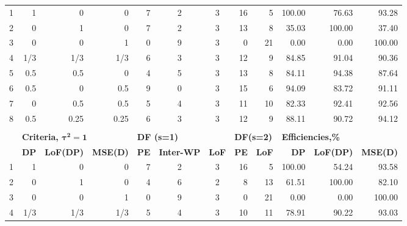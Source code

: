 \begin{table}[h]
{\begin{tabular}{rrrrcccrrrrr}
1 & 1    & 0    & 0    & \multicolumn{1}{|r}{7} & 2 & 3 & \multicolumn{1}{|r}{16} & 5  & \multicolumn{1}{|r}{100.00} & 76.63  & 93.28  \\
2 & 0    & 1    & 0    & \multicolumn{1}{|r}{7} & 2 & 3 & \multicolumn{1}{|r}{13} & 8  & \multicolumn{1}{|r}{35.03}  & 100.00 & 37.40  \\
3 & 0    & 0    & 1    & \multicolumn{1}{|r}{0} & 9 & 3 & \multicolumn{1}{|r}{0}  & 21 & \multicolumn{1}{|r}{0.00}   & 0.00   & 100.00 \\
4 &   1/3  & 1/3  & 1/3& \multicolumn{1}{|r}{6} & 3 & 3 & \multicolumn{1}{|r}{12} & 9  & \multicolumn{1}{|r}{84.85}  & 91.04  & 90.36  \\
5 & 0.5  & 0.5  & 0    & \multicolumn{1}{|r}{4} & 5 & 3 & \multicolumn{1}{|r}{13} & 8  & \multicolumn{1}{|r}{84.11}  & 94.38  & 87.64  \\
6 & 0.5  & 0    & 0.5  & \multicolumn{1}{|r}{9} & 0 & 3 & \multicolumn{1}{|r}{15} & 6  & \multicolumn{1}{|r}{94.09}  & 83.72  & 91.11  \\
7 & 0    & 0.5  & 0.5  & \multicolumn{1}{|r}{5} & 4 & 3 & \multicolumn{1}{|r}{11} & 10 & \multicolumn{1}{|r}{82.33}  & 92.41  & 92.56  \\
8 & 0.5  & 0.25 & 0.25 & \multicolumn{1}{|r}{6} & 3 & 3 & \multicolumn{1}{|r}{12} & 9  & \multicolumn{1}{|r}{88.11}  & 90.72  & 94.12 \\  
 &      &      &      &   &   &   &    &    &        &        &        \\  
  & \multicolumn{3}{l}{\textbf{Criteria, $\bm{\tau^2=1}$}}             & \multicolumn{3}{l}{\textbf{DF (s=1)}}          & \multicolumn{2}{l}{\textbf{DF(s=2)}} & \multicolumn{3}{l}{\textbf{Efficiencies,\%}}     \\
  & \textbf{DP} & \textbf{LoF(DP)} & \textbf{MSE(D)} & \textbf{PE} & \textbf{Inter-WP} & \textbf{LoF} & \textbf{PE}      & \textbf{LoF}      & \textbf{DP} & \textbf{LoF(DP)} & \textbf{MSE(D)} \\
1 & 1    & 0    & 0    & \multicolumn{1}{|r}{7} & 2 & 3 & \multicolumn{1}{|r}{16} & 5  & \multicolumn{1}{|r}{100.00} & 54.24  & 93.58  \\
2 & 0    & 1    & 0    & \multicolumn{1}{|r}{4} & 6 & 2 & \multicolumn{1}{|r}{8}  & 13 & \multicolumn{1}{|r}{61.51}  & 100.00 & 82.10  \\
3 & 0    & 0    & 1    & \multicolumn{1}{|r}{0} & 9 & 3 & \multicolumn{1}{|r}{0}  & 21 & \multicolumn{1}{|r}{0.00}   & 0.00   & 100.00 \\
4 & 1/3  & 1/3  & 1/3  & \multicolumn{1}{|r}{5} & 4 & 3 & \multicolumn{1}{|r}{10} & 11 & \multicolumn{1}{|r}{78.91}  & 90.22  & 93.03  \\

\end{tabular}}
\end{table}
